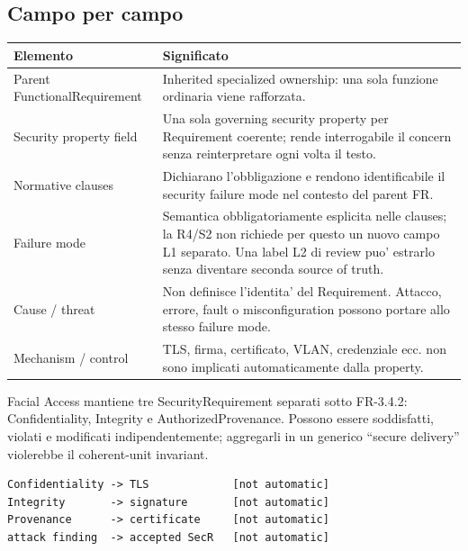 \documentclass[11pt,a4paper]{article}
\begin{document}
\subsection{Campo per campo}

\begin{tabularx}{\textwidth}{L{45mm}Y}
\toprule
\textbf{Elemento} & \textbf{Significato} \\
\midrule
Parent FunctionalRequirement & Inherited specialized ownership: una sola funzione ordinaria viene rafforzata. \\
Security property field & Una sola governing security property per Requirement coerente; rende interrogabile il concern senza reinterpretare ogni volta il testo. \\
Normative clauses & Dichiarano l'obbligazione e rendono identificabile il security failure mode nel contesto del parent FR. \\
Failure mode & Semantica obbligatoriamente esplicita nelle clauses; la R4/S2 non richiede per questo un nuovo campo L1 separato. Una label L2 di review puo' estrarlo senza diventare seconda source of truth. \\
Cause / threat & Non definisce l'identita' del Requirement. Attacco, errore, fault o misconfiguration possono portare allo stesso failure mode. \\
Mechanism / control & TLS, firma, certificato, VLAN, credenziale ecc. non sono implicati automaticamente dalla property. \\
\bottomrule
\end{tabularx}

\begin{ddtaexample}[title={Perche' Confidentiality, Integrity e AuthorizedProvenance restano separate}]
Facial Access mantiene tre SecurityRequirement separati sotto FR-3.4.2: Confidentiality, Integrity e AuthorizedProvenance. Possono essere soddisfatti, violati e modificati indipendentemente; aggregarli in un generico ``secure delivery'' violerebbe il coherent-unit invariant.
\end{ddtaexample}

\begin{ddtaanti}[title={Property != mechanism != attack cause}]
\begin{lstlisting}
Confidentiality -> TLS             [not automatic]
Integrity       -> signature       [not automatic]
Provenance      -> certificate     [not automatic]
attack finding  -> accepted SecR   [not automatic]
\end{lstlisting}
\end{ddtaanti}
\end{document}
